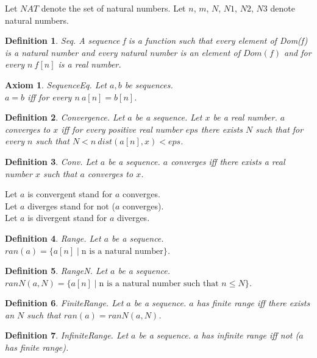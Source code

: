 \documentclass{article}
\newenvironment{forthel}{\begin{leftbar}}{\end{leftbar}}
\newtheorem{axiom}{Axiom}
\newtheorem{definition}{Definition}
\begin{document}
\begin{forthel}
	
	Let $NAT$ denote the set of natural numbers.
	Let $n$, $m$, $N$, $N1$, $N2$, $N3$ denote natural numbers.
	
	\begin{definition} Seq.	A sequence f is a function such that every element of Dom(f) is a natural number and every
	natural number is an element of $Dom(f)$ and for every $n \ f[n]$ is a real number.
	\end{definition}
	
	\begin{axiom} SequenceEq. Let $a, b$ be sequences. \\ $a = b$ iff for every $n \ a[n] = b[n]$.
	\end{axiom}
	
	\begin{definition} Convergence. Let $a$ be a sequence. Let $x$ be a real number. $a$ converges to $x$ iff for every positive real
	number $eps$ there exists $N$ such that for every $n$ such that $N < n \ dist(a[n],x) < eps$.
	\end{definition}
	
	\begin{definition} Conv. Let $a$ be a sequence. $a$ converges iff there exists a real number $x$ such that $a$ converges to $x$.
	\end{definition}
	
	\noindent Let $a$ is convergent stand for $a$ converges.
	\\Let $a$ diverges stand for not ($a$ converges).
	\\Let $a$ is divergent stand for $a$ diverges.
	
	\begin{definition} Range. Let $a$ be a sequence. $ran(a) = \{a[n] \mid \text{n is a natural number}\}$. 
	\end{definition}

	\begin{definition} RangeN. Let $a$ be a sequence. $ranN(a,N) = \{a[n] \mid \text{n is a natural number such that } n \leq N\}$.
	\end{definition}
	
	\begin{definition} FiniteRange.	Let $a$ be a sequence. $a$ has finite range iff there exists an $N$ such that $ran(a) = ranN(a,N)$.
	\end{definition}

	\begin{definition} InfiniteRange. Let $a$ be a sequence. $a$ has infinite range iff not ($a$ has finite range).
	\end{definition}
	

\end{forthel}
\end{document}
